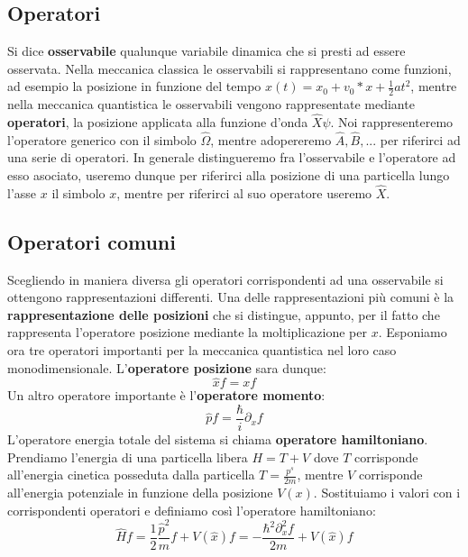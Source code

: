 \subsection{Operatori}
Si dice \textbf{osservabile} qualunque variabile dinamica che si presti ad essere osservata. Nella meccanica classica le osservabili si rappresentano come funzioni, ad esempio la posizione in funzione del tempo $x(t) = x_0 + v_0 * x + \frac{1}{2} a t^2$, mentre nella meccanica quantistica le osservabili vengono rappresentate mediante \textbf{operatori}, la posizione applicata alla funzione d'onda $\hat{X}\psi$. Noi rappresenteremo l'operatore generico con il simbolo $\hat{\Omega}$, mentre adopereremo $\hat{A}, \hat{B}, ...$ per riferirci ad una serie di operatori. In generale distingueremo fra l'osservabile e l'operatore ad esso asociato, useremo dunque per riferirci alla posizione di una particella lungo l'asse $x$ il simbolo $x$, mentre per riferirci al suo operatore useremo $\hat{X}$.

\subsection{Operatori comuni}
Scegliendo in maniera diversa gli operatori corrispondenti ad una osservabile si ottengono rappresentazioni differenti. Una delle rappresentazioni più comuni è la \textbf{rappresentazione delle posizioni} che si distingue, appunto, per il fatto che rappresenta l'operatore posizione mediante la moltiplicazione per $x$. Esponiamo ora tre operatori importanti per la meccanica quantistica nel loro caso monodimensionale. L'\textbf{operatore posizione} sara dunque:
$$\hat{x} f = x f$$
Un altro operatore importante è l'\textbf{operatore momento}:
$$\hat{p} f = \frac{\hbar}{i} \partial_x f$$
L'operatore energia totale del sistema si chiama \textbf{operatore hamiltoniano}. Prendiamo l'energia di una particella libera $H = T + V$ dove $T$ corrisponde all'energia cinetica posseduta dalla particella $T = \frac{p^s}{2 m}$, mentre $V$ corrisponde all'energia potenziale in funzione della posizione $V(x)$. Sostituiamo i valori con i corrispondenti operatori e definiamo così l'operatore hamiltoniano:
$$\hat{H} f = \frac{1}{2}\frac{\hat{p}^2}{m} f + V(\hat{x}) f = -\frac{\hbar^2 \partial_x^2 f}{2 m} + V(\hat{x}) f$$

